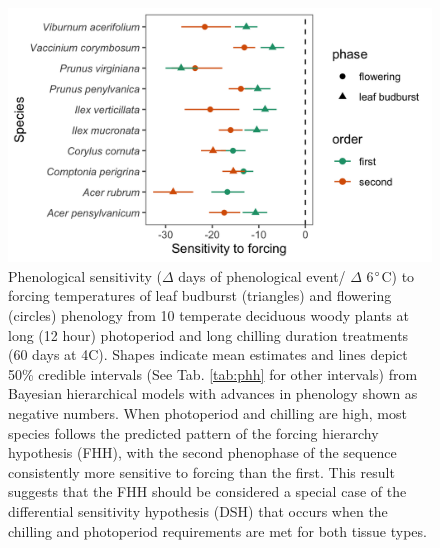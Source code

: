 \documentclass[12pt]{article}\usepackage[]{graphicx}\usepackage[]{color}
\begin{document}
\begin{figure}[h!]
    \centering
         \includegraphics[width=\textwidth]{..//Plots/Flobuds_manuscript_figs/PHH_plot.png} 
    \caption{Phenological sensitivity ($\Delta$ days of phenological event/ $\Delta$ 6$\degree$C) to forcing temperatures of leaf budburst (triangles) and flowering (circles) phenology from 10 temperate deciduous woody plants at long (12 hour) photoperiod and long chilling duration treatments (60 days at 4\degree C). Shapes indicate mean estimates and lines depict 50\% credible intervals (See Tab. \ref{tab:phh} for other intervals) from Bayesian hierarchical models with advances in phenology shown as negative numbers. When photoperiod and chilling are high, most species follows the predicted pattern of the forcing hierarchy hypothesis (FHH), with the second phenophase of the sequence consistently more sensitive to forcing than the first. This result suggests that the FHH should be considered a special case of the differential sensitivity hypothesis (DSH) that occurs when the chilling and photoperiod requirements are met for both tissue types.}
    \label{fig:FHH}
\end{figure}
\end{document}
